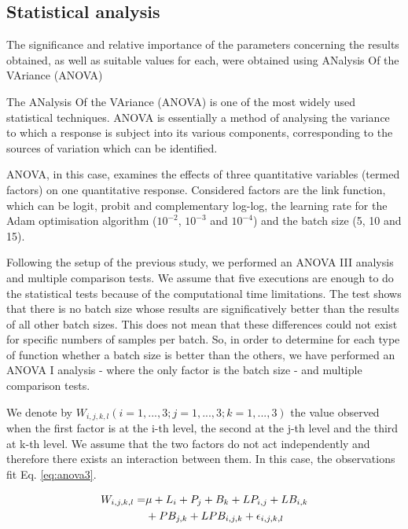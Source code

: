 \documentclass[10pt, a4paper, titlepage, twocolumn]{article}
\begin{document}
	\subsection{Statistical analysis}
	The significance and relative importance of the parameters concerning the results obtained, as well as suitable values for each, were obtained using ANalysis Of the VAriance (ANOVA)
	
	The ANalysis Of the VAriance (ANOVA) \cite{miller1997beyond} is one of the most widely used statistical techniques. ANOVA is essentially a method of analysing the variance to which a response is subject into its various components, corresponding to the sources of variation which can be identified.
	
	ANOVA, in this case, examines the effects of three quantitative variables (termed factors) on one quantitative response. Considered factors are the link function, which can be logit, probit and complementary log-log, the learning rate for the Adam optimisation algorithm ($10^{-2}$, $10^{-3}$ and $10^{-4}$) and the batch size (5, 10 and 15).
	
	Following the setup of the previous study, we performed an ANOVA III analysis and multiple comparison tests. We assume that five executions are enough to do the statistical tests because of the computational time limitations. The test shows that there is no batch size whose results are significatively better than the results of all other batch sizes. This does not mean that these differences could not exist for specific numbers of samples per batch. So, in order to determine for each type of function whether a batch size is better than the others, we have performed an ANOVA I analysis - where the only factor is the batch size - and multiple comparison tests.
	
	We denote by $W_{i,j,k,l}(i=1, ..., 3; j = 1, ..., 3; k = 1, ..., 3)$ the value observed when the first factor is at the i-th level, the second at the j-th level and the third at k-th level. We assume that the two factors do not act independently and therefore there exists an interaction between them. In this case, the observations fit Eq. \ref{eq:anova3}.
	
	\begin{equation}
	\begin{aligned}
	\footnotesize
	W_{i,j,k,l} = & \mu + L_i + P_j + B_k + LP_{i,j} + LB_{i,k} \\& + PB_{j,k} + LPB_{i,j,k} + \epsilon_{i,j,k,l}
	\label{eq:anova3}
	\end{aligned}
	\end{equation}
	
\end{document}
